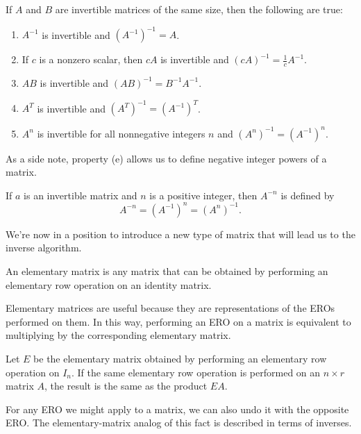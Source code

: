 \documentclass[../m073main.tex]{subfiles}
\begin{document}
\begin{theorem}
	If $A$ and $B$ are invertible matrices of the same size, then the following are true:
	\begin{enumerate}[label=(\alph*)]
		\item $A^{-1}$ is invertible and $(A^{-1})^{-1} = A$.
		\item If $c$ is a nonzero scalar, then $cA$ is invertible and $(cA)^{-1} = \frac{1}{c}A^{-1}$.
		\item $AB$ is invertible and $(AB)^{-1} = B^{-1}A^{-1}$.
		\item $A^T$ is invertible and $(A^T)^{-1} = (A^{-1})^T$.
		\item $A^n$ is invertible for all nonnegative integers $n$ and $(A^n)^{-1} = (A^{-1})^n$.
	\end{enumerate}
\end{theorem}

As a side note, property (e) allows us to define negative integer powers of a matrix.

\begin{definition}
	If $a$ is an invertible matrix and $n$ is a positive integer, then $A^{-n}$ is defined by
	\[ A^{-n} = (A^{-1})^n = (A^n)^{-1}. \]
\end{definition}

We're now in a position to introduce a new type of matrix that will lead us to the inverse algorithm.

\begin{definition}
	An elementary matrix is any matrix that can be obtained by performing an elementary row operation on an identity matrix.
\end{definition}

Elementary matrices are useful because they are representations of the EROs performed on them.
In this way, performing an ERO on a matrix is equivalent to multiplying by the corresponding elementary matrix.

\begin{theorem}
	Let $E$ be the elementary matrix obtained by performing an elementary row operation on $I_n$.
	If the same elementary row operation is performed on an $n\times r$ matrix $A$, the result is the same as the product $EA$.
\end{theorem}

For any ERO we might apply to a matrix, we can also undo it with the opposite ERO.
The elementary-matrix analog of this fact is described in terms of inverses.
\end{document}
